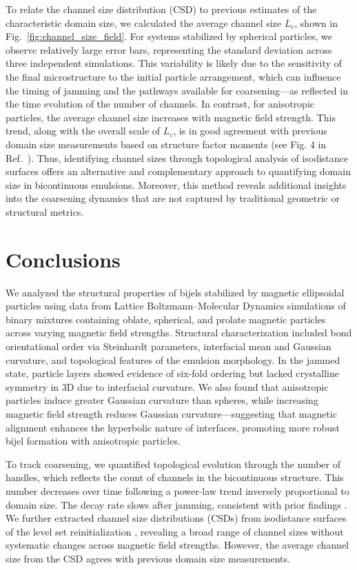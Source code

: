 To relate the channel size distribution (CSD) to previous estimates of the characteristic domain size, we calculated the average channel size \(L_c\), shown in Fig.~\ref{fig:channel_size_field}. For 
systems stabilized by spherical particles, we observe relatively large error bars, representing the standard deviation across three independent simulations. This variability is likely due to the 
sensitivity of the final microstructure to the initial particle arrangement, which can influence the timing of jamming and the pathways available for coarsening—as reflected in the time evolution of 
the number of channels. In contrast, for anisotropic particles, the average channel size increases with magnetic field strength. This trend, along with the overall scale of \(L_c\), is in good agreement 
with previous domain size measurements based on structure factor moments (see Fig. 4 in Ref.~). Thus, identifying channel sizes through topological analysis of 
isodistance surfaces offers an alternative and complementary approach to quantifying domain size in bicontinuous emulsions. Moreover, this method reveals additional insights into the coarsening dynamics 
that are not captured by traditional geometric or structural metrics.


\section{Conclusions\label{conclusions}}

We analyzed the structural properties of bijels stabilized by magnetic ellipsoidal particles using data from Lattice Boltzmann–Molecular Dynamics simulations of binary mixtures containing oblate, 
spherical, and prolate magnetic particles across varying magnetic field strengths. Structural characterization included bond orientational order via Steinhardt parameters, interfacial mean and 
Gaussian curvature, and topological features of the emulsion morphology. In the jammed state, particle layers showed evidence of six-fold ordering but lacked crystalline symmetry in 3D due to 
interfacial curvature. We also found that anisotropic particles induce greater Gaussian curvature than spheres, while increasing magnetic field strength reduces Gaussian curvature—suggesting that 
magnetic alignment enhances the hyperbolic nature of interfaces, promoting more robust bijel formation with anisotropic particles.

To track coarsening, we quantified topological evolution through the number of handles, which reflects the count of channels in the bicontinuous structure. This number decreases over time following a 
power-law trend inversely proportional to domain size. The decay rate slows after jamming, consistent with prior findings \cite{gunther_timescales_2014, karthikeyan_formation_2024}. We further 
extracted channel size distributions (CSDs) from isodistance surfaces of the level set reinitialization \cite{chan_channel_2012}, revealing a broad range of channel sizes without systematic 
changes across magnetic field strengths. However, the average channel size from the CSD agrees with previous domain size measurements.

